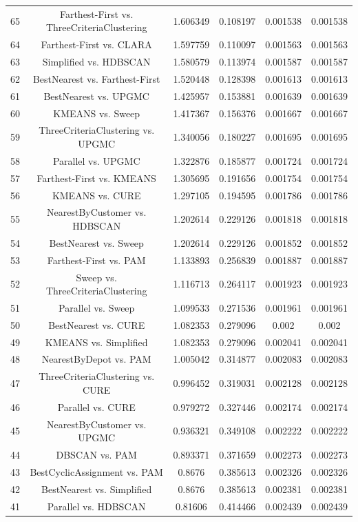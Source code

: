 \documentclass[a4paper,10pt]{article}
\begin{document}
\begin{landscape}
\begin{table}[!htp]
\begin{tabular}{cccccc}
65&Farthest-First vs. ThreeCriteriaClustering&1.606349&0.108197&0.001538&0.001538\\
64&Farthest-First vs. CLARA&1.597759&0.110097&0.001563&0.001563\\
63&Simplified vs. HDBSCAN&1.580579&0.113974&0.001587&0.001587\\
62&BestNearest vs. Farthest-First&1.520448&0.128398&0.001613&0.001613\\
61&BestNearest vs. UPGMC&1.425957&0.153881&0.001639&0.001639\\
60&KMEANS vs. Sweep&1.417367&0.156376&0.001667&0.001667\\
59&ThreeCriteriaClustering vs. UPGMC&1.340056&0.180227&0.001695&0.001695\\
58&Parallel vs. UPGMC&1.322876&0.185877&0.001724&0.001724\\
57&Farthest-First vs. KMEANS&1.305695&0.191656&0.001754&0.001754\\
56&KMEANS vs. CURE&1.297105&0.194595&0.001786&0.001786\\
55&NearestByCustomer vs. HDBSCAN&1.202614&0.229126&0.001818&0.001818\\
54&BestNearest vs. Sweep&1.202614&0.229126&0.001852&0.001852\\
53&Farthest-First vs. PAM&1.133893&0.256839&0.001887&0.001887\\
52&Sweep vs. ThreeCriteriaClustering&1.116713&0.264117&0.001923&0.001923\\
51&Parallel vs. Sweep&1.099533&0.271536&0.001961&0.001961\\
50&BestNearest vs. CURE&1.082353&0.279096&0.002&0.002\\
49&KMEANS vs. Simplified&1.082353&0.279096&0.002041&0.002041\\
48&NearestByDepot vs. PAM&1.005042&0.314877&0.002083&0.002083\\
47&ThreeCriteriaClustering vs. CURE&0.996452&0.319031&0.002128&0.002128\\
46&Parallel vs. CURE&0.979272&0.327446&0.002174&0.002174\\
45&NearestByCustomer vs. UPGMC&0.936321&0.349108&0.002222&0.002222\\
44&DBSCAN vs. PAM&0.893371&0.371659&0.002273&0.002273\\
43&BestCyclicAssignment vs. PAM&0.8676&0.385613&0.002326&0.002326\\
42&BestNearest vs. Simplified&0.8676&0.385613&0.002381&0.002381\\
41&Parallel vs. HDBSCAN&0.81606&0.414466&0.002439&0.002439\\

\end{tabular}
\end{table}
\end{landscape}
\end{document}
